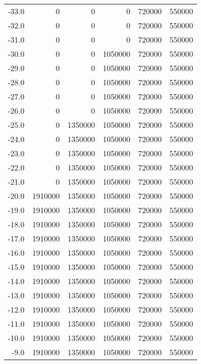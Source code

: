 \begin{samepage}
\begin{center}
{\begin{tabular}{rrrrrr}
	-33.0 &        0 &        0 &        0 &   720000 &   550000 \\
	-32.0 &        0 &        0 &        0 &   720000 &   550000 \\
	-31.0 &        0 &        0 &        0 &   720000 &   550000 \\
	-30.0 &        0 &        0 &  1050000 &   720000 &   550000 \\
	-29.0 &        0 &        0 &  1050000 &   720000 &   550000 \\
	-28.0 &        0 &        0 &  1050000 &   720000 &   550000 \\
	-27.0 &        0 &        0 &  1050000 &   720000 &   550000 \\
	-26.0 &        0 &        0 &  1050000 &   720000 &   550000 \\
	-25.0 &        0 &  1350000 &  1050000 &   720000 &   550000 \\
	-24.0 &        0 &  1350000 &  1050000 &   720000 &   550000 \\
	-23.0 &        0 &  1350000 &  1050000 &   720000 &   550000 \\
	-22.0 &        0 &  1350000 &  1050000 &   720000 &   550000 \\
	-21.0 &        0 &  1350000 &  1050000 &   720000 &   550000 \\
	-20.0 &  1910000 &  1350000 &  1050000 &   720000 &   550000 \\
	-19.0 &  1910000 &  1350000 &  1050000 &   720000 &   550000 \\
	-18.0 &  1910000 &  1350000 &  1050000 &   720000 &   550000 \\
	-17.0 &  1910000 &  1350000 &  1050000 &   720000 &   550000 \\
	-16.0 &  1910000 &  1350000 &  1050000 &   720000 &   550000 \\
	-15.0 &  1910000 &  1350000 &  1050000 &   720000 &   550000 \\
	-14.0 &  1910000 &  1350000 &  1050000 &   720000 &   550000 \\
	-13.0 &  1910000 &  1350000 &  1050000 &   720000 &   550000 \\
	-12.0 &  1910000 &  1350000 &  1050000 &   720000 &   550000 \\
	-11.0 &  1910000 &  1350000 &  1050000 &   720000 &   550000 \\
	-10.0 &  1910000 &  1350000 &  1050000 &   720000 &   550000 \\
	-9.0 &  1910000 &  1350000 &  1050000 &   720000 &   550000 \\

\end{tabular}}
\end{center}
\end{samepage}
